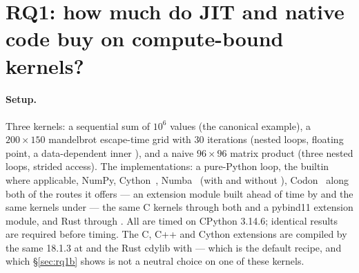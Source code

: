 
\section{RQ1: how much do JIT and native code buy on compute-bound kernels?}
\label{sec:rq1}


\paragraph{Setup.} Three kernels: a sequential sum of $10^6$  values (the
canonical example), a $200{\times}150$ mandelbrot escape-time grid with 30 iterations
(nested loops, floating point, a data-dependent inner ), and a naive
$96{\times}96$  matrix product (three nested loops, strided access). The
implementations: a pure-Python loop, the builtin  where applicable, NumPy,
Cython~\cite{cython}, Numba~\cite{numba} (with and without ), Codon~\cite{codon}
along both of the routes it offers --- an extension module built ahead of time by
 and the same kernels under  --- the same C kernels
through both  and a pybind11 extension module, and Rust through . All are
timed on CPython 3.14.6; identical results are required before timing. The C, C++ and Cython
extensions are compiled by the same  18.1.3 at  and the Rust
cdylib with  --- which is the default recipe, and which
\S\ref{sec:rq1b} shows is not a neutral choice on one of these kernels.

\begin{table}[t]
  \centering
  \caption{RQ1: compute-bound kernels on CPython 3.14.6, on the single host of
    Table~\ref{tab:platform}. Median per-call time and speedup over the pure-Python loop.
    NumPy's  row is a vendor-BLAS data point, not a compiler one.}
  \label{tab:compute}
  \small
  
\end{table}

